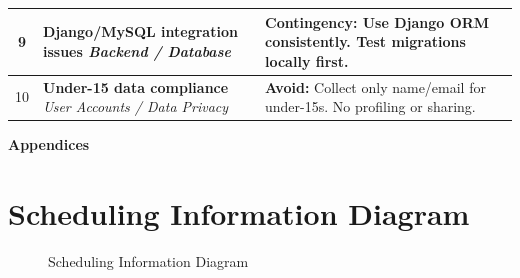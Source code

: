 \documentclass[11pt, a4paper]{report}
\begin{document}
\begin{table}[h!]
\begin{tabularx}{\textwidth}{c >{\hsize=0.9\hsize\raggedright\arraybackslash}X >{\hsize=1.1\hsize\raggedright\arraybackslash}X}
        \midrule
        \cellcolor{riskMedium} 9 & \textbf{Django/MySQL integration issues} \newline \textit{Backend / Database} & \textbf{Contingency:} Use Django ORM consistently. Test migrations locally first. \\
        \midrule
        \cellcolor{riskHigh} 10  & \textbf{Under-15 data compliance} \newline \textit{User Accounts / Data Privacy} & \textbf{Avoid:} Collect only name/email for under-15s. No profiling or sharing. \\
        \bottomrule
    \end{tabularx}
\end{table}

\appendix
\clearpage
{}

\begin{center}
    \thispagestyle{empty}
    \vspace*{\fill}
    {\LARGE\bfseries{Appendices}\par}
    \vspace*{\fill}
\end{center}

\chapter{Scheduling Information Diagram}

\begin{figure}[htbp]
  \centering
  \caption{Scheduling Information Diagram}
  \label{fig:schedule_placeholder}
\end{figure}
\end{document}
